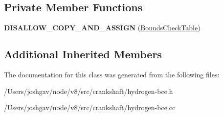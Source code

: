 \subsection*{Private Member Functions}
\begin{DoxyCompactItemize}
\item 
{\bfseries D\+I\+S\+A\+L\+L\+O\+W\+\_\+\+C\+O\+P\+Y\+\_\+\+A\+N\+D\+\_\+\+A\+S\+S\+I\+GN} (\hyperlink{classv8_1_1internal_1_1_bounds_check_table}{Bounds\+Check\+Table})\hypertarget{classv8_1_1internal_1_1_bounds_check_table_a5cc6db1db14b4a54373e71e5f695e5de}{}\label{classv8_1_1internal_1_1_bounds_check_table_a5cc6db1db14b4a54373e71e5f695e5de}

\end{DoxyCompactItemize}
\subsection*{Additional Inherited Members}


The documentation for this class was generated from the following files\+:\begin{DoxyCompactItemize}
\item 
/\+Users/joshgav/node/v8/src/crankshaft/hydrogen-\/bce.\+h\item 
/\+Users/joshgav/node/v8/src/crankshaft/hydrogen-\/bce.\+cc\end{DoxyCompactItemize}
